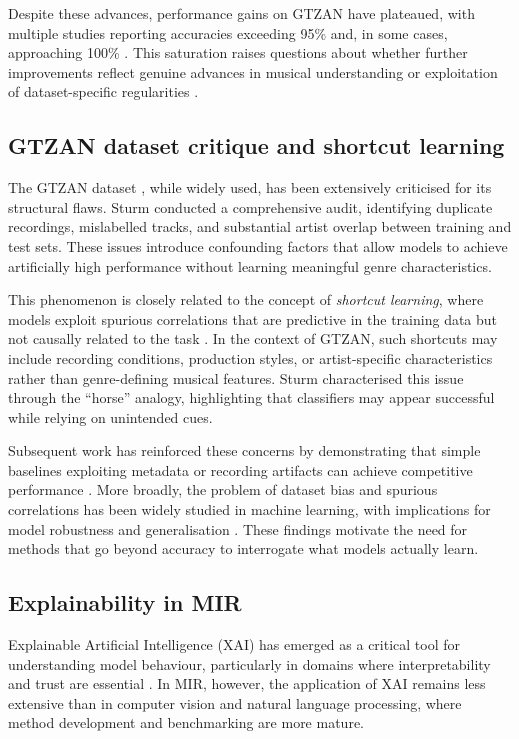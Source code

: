 \documentclass{article}
\begin{document}
Despite these advances, performance gains on GTZAN have plateaued, with multiple studies reporting accuracies exceeding 95\% and, in some cases, approaching 100\% \cite{Lim2025,Nanni2023}. This saturation raises questions about whether further improvements reflect genuine advances in musical understanding or exploitation of dataset-specific regularities \cite{Sturm2016}.

\subsection{GTZAN dataset critique and shortcut learning}

The GTZAN dataset \cite{Tzanetakis2002}, while widely used, has been extensively criticised for its structural flaws. Sturm \cite{sturm2013gtzan} conducted a comprehensive audit, identifying duplicate recordings, mislabelled tracks, and substantial artist overlap between training and test sets. These issues introduce confounding factors that allow models to achieve artificially high performance without learning meaningful genre characteristics.

This phenomenon is closely related to the concept of \textit{shortcut learning}, where models exploit spurious correlations that are predictive in the training data but not causally related to the task \cite{Geirhos2020}. In the context of GTZAN, such shortcuts may include recording conditions, production styles, or artist-specific characteristics rather than genre-defining musical features. Sturm \cite{Sturm2014} characterised this issue through the ``horse'' analogy, highlighting that classifiers may appear successful while relying on unintended cues.

Subsequent work has reinforced these concerns by demonstrating that simple baselines exploiting metadata or recording artifacts can achieve competitive performance \cite{Flexer2007}. More broadly, the problem of dataset bias and spurious correlations has been widely studied in machine learning, with implications for model robustness and generalisation \cite{Torralba2011}. These findings motivate the need for methods that go beyond accuracy to interrogate what models actually learn.

\subsection{Explainability in MIR}

Explainable Artificial Intelligence (XAI) has emerged as a critical tool for understanding model behaviour, particularly in domains where interpretability and trust are essential \cite{Arrieta2020}. In MIR, however, the application of XAI remains less extensive than in computer vision and natural language processing, where method development and benchmarking are more mature.
\end{document}
